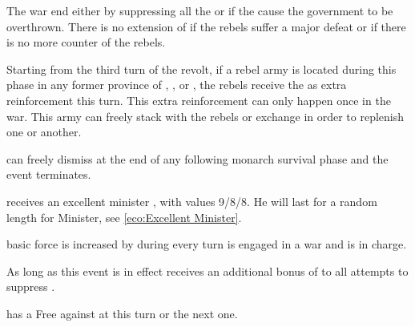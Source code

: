\phpaix
\aparag The war end either by suppressing all the \REVOLT or if the \REVOLT
cause the government to be overthrown.
\aparag There is no extension of \REVOLT if the rebels suffer a major defeat
or if there is no more \ARMY counter of the rebels.


\phadm
\aparag Starting from the third turn of the revolt, if a rebel army is located
during this phase in any former province of \payskazan, \paysastrakhan, or
\payssteppes, the rebels receive the \paysSiberie \ARMY\faceplus as extra
reinforcement this turn.
\bparag This extra reinforcement can only happen once in the war.
\bparag This army can freely stack with the rebels or exchange \LD in order to
replenish one or another.





\aparag \RUS can freely dismiss \ministrePotemkine at the end of any following
monarch survival phase and the event terminates.

\phevnt
\aparag \RUS receives an excellent minister \ministrePotemkine, with values
9/8/8.  He will last for a random length for Minister, see \ref{eco:Excellent
  Minister}.

\phadm
\aparag \RUS basic force is increased by \FLEET\facemoins during every turn
\RUS is engaged in a war and \ministrePotemkine is in charge.

\phmil
\aparag As long as this event is in effect \RUS receives an additional bonus
of  to all attempts to suppress \REVOLT .





\phevnt
\aparag \RUS has a Free \CB against \TUR at this turn or the next one.




